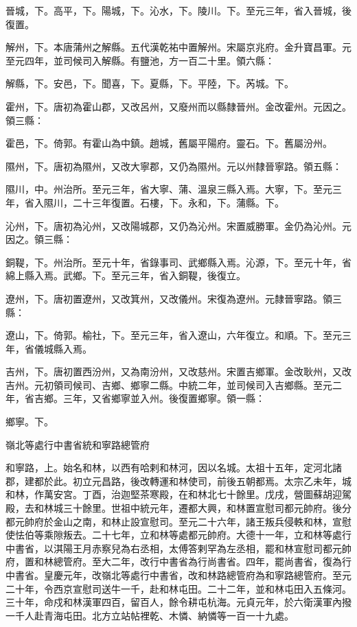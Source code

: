 \begin{pinyinscope}
 晉城，下。高平，下。陽城，下。沁水，下。陵川。下。至元三年，省入晉城，後復置。



 解州，下。本唐蒲州之解縣。五代漢乾祐中置解州。宋屬京兆府。金升寶昌軍。元至元四年，並司候司入解縣。有鹽池，方一百二十里。領六縣：



 解縣，下。安邑，下。聞喜，下。夏縣，下。平陸，下。芮城。下。



 霍州，下。唐初為霍山郡，又改呂州，又廢州而以縣隸晉州。金改霍州。元因之。領三縣：



 霍邑，下。倚郭。有霍山為中鎮。趙城，舊屬平陽府。靈石。下。舊屬汾州。



 隰州，下。唐初為隰州，又改大寧郡，又仍為隰州。元以州隸晉寧路。領五縣：



 隰川，中。州治所。至元三年，省大寧、蒲、溫泉三縣入焉。大寧，下。至元三年，省入隰川，二十三年復置。石樓，下。永和，下。蒲縣。下。



 沁州，下。唐初為沁州，又改陽城郡，又仍為沁州。宋置威勝軍。金仍為沁州。元因之。領三縣：



 銅鞮，下。州治所。至元十年，省錄事司、武鄉縣入焉。沁源，下。至元十年，省綿上縣入焉。武鄉。下。至元三年，省入銅鞮，後復立。



 遼州，下。唐初置遼州，又改箕州，又改儀州。宋復為遼州。元隸晉寧路。領三縣：



 遼山，下。倚郭。榆社，下。至元三年，省入遼山，六年復立。和順。下。至元三年，省儀城縣入焉。



 吉州，下。唐初置西汾州，又為南汾州，又改慈州。宋置吉鄉軍。金改耿州，又改吉州。元初領司候司、吉鄉、鄉寧二縣。中統二年，並司候司入吉鄉縣。至元二年，省吉鄉。三年，又省鄉寧並入州。後復置鄉寧。領一縣：



 鄉寧。下。



 嶺北等處行中書省統和寧路總管府



 和寧路，上。始名和林，以西有哈剌和林河，因以名城。太祖十五年，定河北諸郡，建都於此。初立元昌路，後改轉運和林使司，前後五朝都焉。太宗乙未年，城和林，作萬安宮。丁酉，治迦堅茶寒殿，在和林北七十餘里。戊戌，營圖蘇胡迎駕殿，去和林城三十餘里。世祖中統元年，遷都大興，和林置宣慰司都元帥府。後分都元帥府於金山之南，和林止設宣慰司。至元二十六年，諸王叛兵侵軼和林，宣慰使怯伯等乘隙叛去。二十七年，立和林等處都元帥府。大德十一年，立和林等處行中書省，以淇陽王月赤察兒為右丞相，太傅答剌罕為左丞相，罷和林宣慰司都元帥府，置和林總管府。至大二年，改行中書省為行尚書省。四年，罷尚書省，復為行中書省。皇慶元年，改嶺北等處行中書省，改和林路總管府為和寧路總管府。至元二十年，令西京宣慰司送牛一千，赴和林屯田。二十二年，並和林屯田入五條河。三十年，命戍和林漢軍四百，留百人，餘令耕屯杭海。元貞元年，於六衛漢軍內撥一千人赴青海屯田。北方立站帖裡乾、木憐、納憐等一百一十九處。



\end{pinyinscope}
